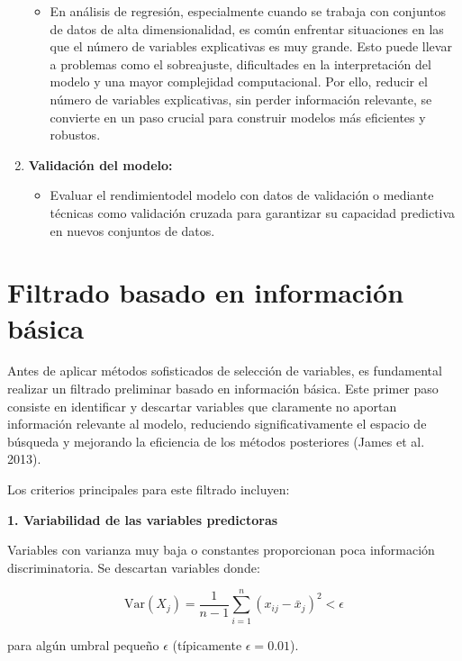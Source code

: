\documentclass[
  letterpaper,
  DIV=11,
  numbers=noendperiod]{scrreprt}
\providecommand{\tightlist}{%
  \setlength{\itemsep}{0pt}\setlength{\parskip}{0pt}}
\begin{document}
\begin{enumerate}
  \begin{itemize}
  \tightlist
  \item
    En análisis de regresión, especialmente cuando se trabaja con
    conjuntos de datos de alta dimensionalidad, es común enfrentar
    situaciones en las que el número de variables explicativas es muy
    grande. Esto puede llevar a problemas como el sobreajuste,
    dificultades en la interpretación del modelo y una mayor complejidad
    computacional. Por ello, reducir el número de variables
    explicativas, sin perder información relevante, se convierte en un
    paso crucial para construir modelos más eficientes y robustos.
  \end{itemize}
\item
  \textbf{Validación del modelo:}

  \begin{itemize}
  \tightlist
  \item
    Evaluar el rendimientodel modelo con datos de validación o mediante
    técnicas como validación cruzada para garantizar su capacidad
    predictiva en nuevos conjuntos de datos.
  \end{itemize}
\end{enumerate}

\section{Filtrado basado en información
básica}\label{filtrado-basado-en-informaciuxf3n-buxe1sica}

Antes de aplicar métodos sofisticados de selección de variables, es
fundamental realizar un filtrado preliminar basado en información
básica. Este primer paso consiste en identificar y descartar variables
que claramente no aportan información relevante al modelo, reduciendo
significativamente el espacio de búsqueda y mejorando la eficiencia de
los métodos posteriores (James et al. 2013).

Los criterios principales para este filtrado incluyen:

\textbf{1. Variabilidad de las variables predictoras}

Variables con varianza muy baja o constantes proporcionan poca
información discriminatoria. Se descartan variables donde:

\[\text{Var}(X_j) = \frac{1}{n-1}\sum_{i=1}^{n}(x_{ij} - \bar{x}_j)^2 < \epsilon\]

para algún umbral pequeño \(\epsilon\) (típicamente
\(\epsilon = 0.01\)).
\end{document}
